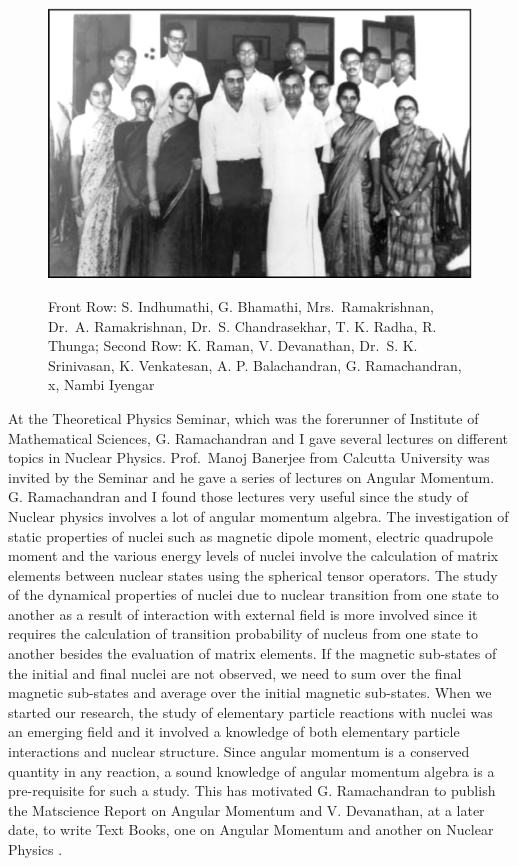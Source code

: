 \begin{figure}[H]
\centering
\includegraphics[scale=.35]{src/images/chap3/chap3-fig3.eps}\\
\caption{Front Row: S. Indhumathi, G. Bhamathi, Mrs.\ Ramakrishnan, Dr.\ A. Ramakrishnan, Dr.\ S. Chandrasekhar, T. K. Radha, R. Thunga;
Second Row: K. Raman, V. Devanathan, Dr.\ S. K. Srinivasan, K. Venkatesan, A. P. Balachandran, G. Ramachandran, x, Nambi Iyengar}
\end{figure}

At the Theoretical Physics Seminar, which was the forerunner of Institute of Mathematical Sciences, G. Ramachandran and I gave several lectures on different topics in Nuclear Physics. Prof.\ Manoj Banerjee from Calcutta University was invited by the Seminar and he gave a series of lectures on Angular Momentum. G. Ramachandran and I found those lectures very useful since the study of Nuclear physics involves a lot of angular momentum algebra. The investigation of static properties of nuclei such as magnetic dipole moment, electric quadrupole moment and the various energy levels of nuclei involve the calculation of matrix elements between nuclear states using the spherical tensor operators. The study of the dynamical properties of nuclei due to nuclear transition from one state to another as a result of interaction with external field is more involved since it requires the calculation of transition probability of nucleus from one state to another besides the evaluation of matrix elements. If the magnetic sub-states of the initial and final nuclei are not observed, we need to sum over the final magnetic sub-states and average over the initial magnetic sub-states. When we started our research, the study of elementary particle reactions with nuclei was an emerging field and it involved a knowledge of both elementary particle interactions and nuclear structure. Since angular momentum is a conserved quantity in any reaction, a sound knowledge of angular momentum algebra is a pre-requisite for such a study. This has motivated G. Ramachandran to publish the Matscience Report on Angular Momentum \cite{chap3-key10} and V. Devanathan, at a later date, to write Text Books, one on Angular Momentum \cite{chap3-key11} and another on Nuclear Physics \cite{chap3-key12}.

